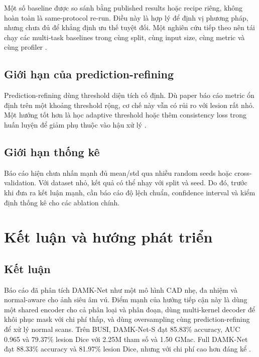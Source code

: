 \documentclass[12pt,a4paper,oneside]{report}
\newcommand{\modelname}{DAMK-Net}
\begin{document}
Một số baseline được so sánh bằng published results hoặc recipe riêng, không hoàn toàn là same-protocol re-run. Điều này là hợp lý để định vị phương pháp, nhưng chưa đủ để khẳng định ưu thế tuyệt đối. Một nghiên cứu tiếp theo nên tái chạy các multi-task baselines trong cùng split, cùng input size, cùng metric và cùng profiler \citep{mkunet,mednet,damknet}.

\section{Giới hạn của prediction-refining}

Prediction-refining dùng threshold diện tích cố định. Dù paper báo cáo metric ổn định trên một khoảng threshold rộng, cơ chế này vẫn có rủi ro với lesion rất nhỏ. Một hướng tốt hơn là học adaptive threshold hoặc thêm consistency loss trong huấn luyện để giảm phụ thuộc vào hậu xử lý \citep{aumente,damknet}.

\section{Giới hạn thống kê}

Báo cáo hiện chưa nhấn mạnh đủ mean/std qua nhiều random seeds hoặc cross-validation. Với dataset nhỏ, kết quả có thể nhạy với split và seed. Do đó, trước khi đưa ra kết luận mạnh, cần báo cáo độ lệch chuẩn, confidence interval và kiểm định thống kê cho các ablation chính.

\chapter{Kết luận và hướng phát triển}

\section{Kết luận}

Báo cáo đã phân tích \modelname{} như một mô hình CAD nhẹ, đa nhiệm và normal-aware cho ảnh siêu âm vú. Điểm mạnh của hướng tiếp cận này là dùng một shared encoder cho cả phân loại và phân đoạn, dùng multi-kernel decoder để khôi phục mask với chi phí thấp, và dùng oversampling cùng prediction-refining để xử lý normal scans. Trên BUSI, \modelname{}-S đạt 85.83\% accuracy, AUC 0.965 và 79.37\% lesion Dice với 2.25M tham số và 1.50 GMac. Full \modelname{} đạt 88.33\% accuracy và 81.97\% lesion Dice, nhưng với chi phí cao hơn đáng kể \citep{busi,damknet}.
\end{document}
